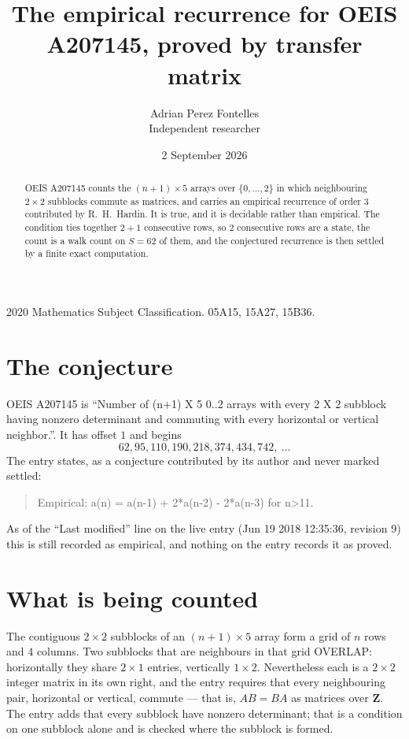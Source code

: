 \documentclass[11pt,a4paper]{article}
\title{The empirical recurrence for OEIS A207145, proved by transfer matrix}
\author{Adrian Perez Fontelles\\ \small Independent researcher}
\date{2 September 2026}
\theoremstyle{plain}
\theoremstyle{definition}
\begin{document}
\maketitle

\begin{abstract}
OEIS A207145 counts the $(n+1)\times5$ arrays over $\{0,\dots,2\}$ in which
neighbouring $2\times2$ subblocks commute as matrices, and carries an empirical recurrence
of order $3$ contributed by R.~H.~Hardin. It is true, and it is decidable rather than
empirical. The condition ties together $2+1$ consecutive rows, so $2$ consecutive rows are
a state, the count is a walk count on $S=62$ of them, and the conjectured recurrence is then
settled by a finite exact computation.
\end{abstract}

\noindent\small 2020 Mathematics Subject Classification. 05A15, 15A27, 15B36.\normalsize

\section{The conjecture}

OEIS A207145 is ``Number of (n+1) X 5 0..2 arrays with every 2 X 2 subblock having nonzero determinant and commuting with every horizontal or vertical neighbor.''. It has offset $1$ and begins
\[
62, 95, 110, 190, 218, 374, 434, 742,\ \dots
\]
The entry states, as a conjecture contributed by its author and never marked settled:
\begin{quote}
Empirical: a(n) = a(n-1) + 2*a(n-2) - 2*a(n-3) for n>11.
\end{quote}
As of the ``Last modified'' line on the live entry (Jun 19 2018 12:35:36, revision 9) this is still
recorded as empirical, and nothing on the entry records it as proved.

\section{What is being counted}

The contiguous $2\times2$ subblocks of an $(n+1)\times5$ array form a grid of $n$
rows and $4$ columns. Two subblocks that are neighbours in that
grid OVERLAP: horizontally they share $2\times1$ entries, vertically
$1\times2$. Nevertheless each is a $2\times2$ integer matrix in its own right, and
the entry requires that every neighbouring pair, horizontal or vertical, commute --- that is,
$AB=BA$ as matrices over $\mathbf{Z}$. The entry adds that every subblock have nonzero determinant; that is a condition on one subblock alone and is checked where the subblock is formed.
\end{document}
